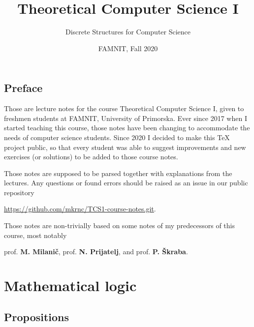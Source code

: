 \documentclass[11pt,paper=b5,footinclude,headinclude]{scrbook} %
\theoremstyle{remark}
\theoremstyle{definition} %
\theoremstyle{theorem} %
\begin{document}
\title{Theoretical Computer Science I}


\date{FAMNIT, Fall 2020}
\author{Discrete Structures for Computer Science\\}
\maketitle

\section*{Preface}
    Those are lecture notes for the course Theoretical Computer Science I, given to freshmen students at FAMNIT, University of Primorska.
Ever since 2017 when I started teaching this course, those notes have been changing to accommodate the needs of computer science students.
Since 2020 I decided to make this TeX project public, so that every student was able to suggest improvements and new exercises (or solutions) to be added to those course notes. 

Those notes are supposed to be parsed together with explanations from the lectures. 
Any questions or found errors should be 
raised as an issue in our public repository 
\begin{center}
    \url{https://github.com/mkrnc/TCS1-course-notes.git}.    
\end{center}

\medskip
Those notes are non-trivially based on some notes of my predecessors of this course, most notably 
\begin{center}
    prof. \textbf{M. Milanič}, 
    prof. \textbf{N. Prijatelj}, and 
    prof. \textbf{P. Škraba}.
\end{center}


\tableofcontents

\chapter{Mathematical logic}
\section{Propositions}
\end{document}
